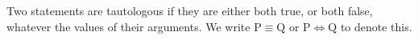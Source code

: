 Two statements are tautologous if they are either both true, or both false,
whatever the values of their arguments. We write $ \mathrm{P} \equiv \mathrm{Q} $ 
or $ \mathrm{P} \iff \mathrm{Q} $
to denote this.